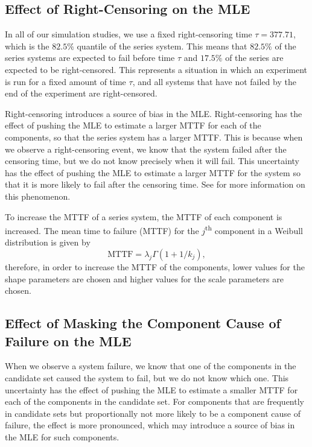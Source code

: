 \documentclass[
]{article}
\begin{document}
\hypertarget{sec:effect-censoring}{%
\subsection{Effect of Right-Censoring on the
MLE}\label{sec:effect-censoring}}

In all of our simulation studies, we use a fixed right-censoring time
\(\tau = 377.71\), which is the \(82.5\%\) quantile of the series
system. This means that \(82.5\%\) of the series systems are expected to
fail before time \(\tau\) and \(17.5\%\) of the series are expected to
be right-censored. This represents a situation in which an experiment is
run for a fixed amount of time \(\tau\), and all systems that have not
failed by the end of the experiment are right-censored.

Right-censoring introduces a source of bias in the MLE. Right-censoring
has the effect of pushing the MLE to estimate a larger MTTF for each of
the components, so that the series system has a larger MTTF. This is
because when we observe a right-censoring event, we know that the system
failed after the censoring time, but we do not know precisely when it
will fail. This uncertainty has the effect of pushing the MLE to
estimate a larger MTTF for the system so that it is more likely to fail
after the censoring time. See \cite{klein2005survival} for more
information on this phenomenon.

To increase the MTTF of a series system, the MTTF of each component is
increased. The mean time to failure (MTTF) for the
\(j\)\textsuperscript{th} component in a Weibull distribution is given
by \begin{equation}
\label{eq:mttf-wei}
\text{MTTF} = \lambda_j \Gamma(1 + 1/k_j),
\end{equation} therefore, in order to increase the MTTF of the
components, lower values for the shape parameters are chosen and higher
values for the scale parameters are chosen.

\hypertarget{sec:effect-masking}{%
\subsection{Effect of Masking the Component Cause of Failure on the
MLE}\label{sec:effect-masking}}

When we observe a system failure, we know that one of the components in
the candidate set caused the system to fail, but we do not know which
one. This uncertainty has the effect of pushing the MLE to estimate a
smaller MTTF for each of the components in the candidate set. For
components that are frequently in candidate sets but proportionally not
more likely to be a component cause of failure, the effect is more
pronounced, which may introduce a source of bias in the MLE for such
components.
\end{document}
